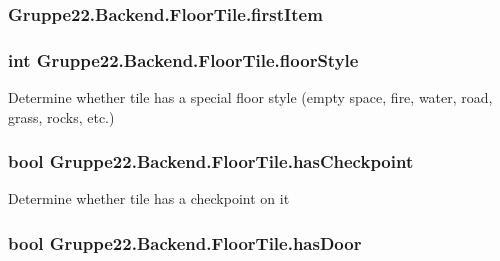 \hypertarget{class_gruppe22_1_1_backend_1_1_floor_tile_af1b9c44771c17dd815b3386d66a09329}{
\subsubsection[{first\-Item}]{ Gruppe22.\-Backend.\-Floor\-Tile.\-first\-Item\hspace{0.3cm}{\ttfamily [get]}}}\label{class_gruppe22_1_1_backend_1_1_floor_tile_af1b9c44771c17dd815b3386d66a09329}
\hypertarget{class_gruppe22_1_1_backend_1_1_floor_tile_aba100c4046831211768aeddb2851f6b2}{
\subsubsection[{floor\-Style}]{\setlength{\rightskip}{0pt plus 5cm}int Gruppe22.\-Backend.\-Floor\-Tile.\-floor\-Style\hspace{0.3cm}{\ttfamily [get]}}}\label{class_gruppe22_1_1_backend_1_1_floor_tile_aba100c4046831211768aeddb2851f6b2}


Determine whether tile has a special floor style (empty space, fire, water, road, grass, rocks, etc.) 

\hypertarget{class_gruppe22_1_1_backend_1_1_floor_tile_a4dc2e696b9103c702ebbf5a8f898f99d}{
\subsubsection[{has\-Checkpoint}]{\setlength{\rightskip}{0pt plus 5cm}bool Gruppe22.\-Backend.\-Floor\-Tile.\-has\-Checkpoint\hspace{0.3cm}{\ttfamily [get]}}}\label{class_gruppe22_1_1_backend_1_1_floor_tile_a4dc2e696b9103c702ebbf5a8f898f99d}


Determine whether tile has a checkpoint on it 

\hypertarget{class_gruppe22_1_1_backend_1_1_floor_tile_ab92743f9c2bebd18192a91d7a1c2c194}{
\subsubsection[{has\-Door}]{\setlength{\rightskip}{0pt plus 5cm}bool Gruppe22.\-Backend.\-Floor\-Tile.\-has\-Door\hspace{0.3cm}{\ttfamily [get]}}}\label{class_gruppe22_1_1_backend_1_1_floor_tile_ab92743f9c2bebd18192a91d7a1c2c194}


